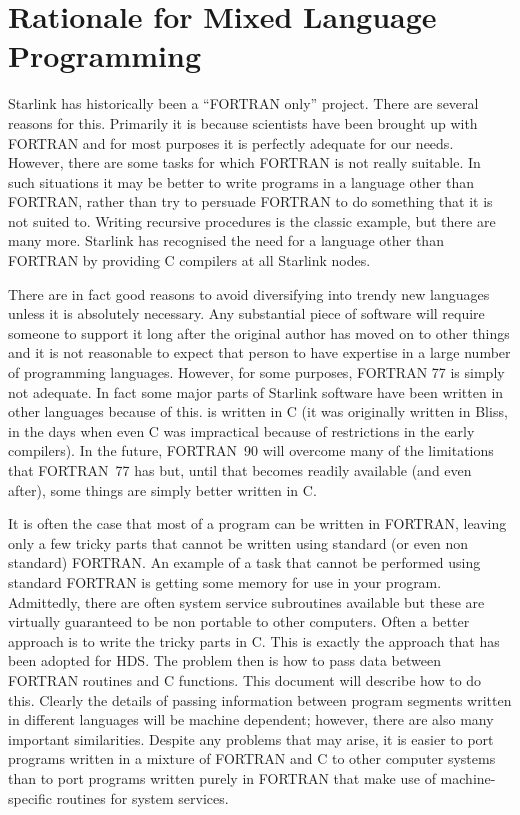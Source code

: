 \documentclass[twoside,11pt,nolof]{starlink}
\begin{document}
\newpage

\section{\label{rationale}Rationale for Mixed Language Programming}
Starlink has historically been a ``FORTRAN only'' project. There are several
reasons for this. Primarily it is because scientists have been brought up with
FORTRAN and for most purposes it is perfectly adequate for our needs. However,
there are some tasks for which FORTRAN is not really suitable. In such
situations it may be better to write programs in a language other than FORTRAN,
rather than try to persuade FORTRAN to do something that it is not suited to.
Writing recursive procedures is the classic example, but there are many more.
Starlink has recognised the need for a language other than FORTRAN by providing
C compilers at all Starlink nodes.

There are in fact good reasons to avoid diversifying into trendy new languages
unless it is absolutely necessary. Any substantial piece of software will
require someone to support it long after the original author has moved on to
other things and it is not reasonable to expect that person to have expertise
in a large number of programming languages. However, for some purposes, FORTRAN
77 is simply not adequate. In fact some major parts of Starlink software have
been written in other languages because of this.
 
is written in C (it was originally written in Bliss, in the days when even C
was impractical because of restrictions in the early compilers).
In the future, FORTRAN~90 will overcome many of the limitations that
FORTRAN~77 has but, until that becomes readily available (and even after),
some things are simply better written in C\@.

It is often the case that most of a program can be written in FORTRAN, leaving
only a few tricky parts that cannot be written using standard (or even non
standard) FORTRAN\@. An example of a task that cannot be performed using
standard FORTRAN is getting some memory for use in your program.
Admittedly, there are often system service subroutines available but these are
virtually guaranteed to be non portable to other computers.
Often a better approach is to write the tricky parts in C\@. This is exactly the
approach that has been adopted for HDS.
The problem then is how to pass data between FORTRAN routines and C functions.
This document will describe  how to do this.
Clearly the details of passing information between program segments
written in different languages will be machine dependent; however, there are
also many important similarities. Despite any problems that may arise, it is
easier to port programs written in a mixture of FORTRAN and C to other computer
systems than to port programs written purely in FORTRAN that make use of
machine-specific routines for system services.
\end{document}
